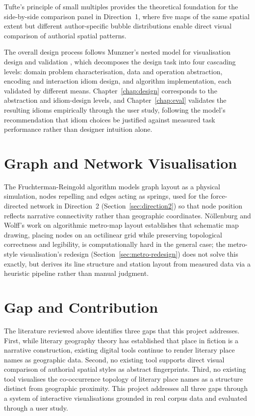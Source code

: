 \documentclass[logo,msc]{infthesis}
\begin{document}
Tufte's principle of small multiples \cite{tufte1983} provides the theoretical foundation for the side-by-side comparison panel in Direction~1, where five maps of the same spatial extent but different author-specific bubble distributions enable direct visual comparison of authorial spatial patterns.

The overall design process follows Munzner's nested model for visualisation design and validation \cite{munzner2014}, which decomposes the design task into four cascading levels: domain problem characterisation, data and operation abstraction, encoding and interaction idiom design, and algorithm implementation, each validated by different means. Chapter~\ref{chap:design} corresponds to the abstraction and idiom-design levels, and Chapter~\ref{chap:eval} validates the resulting idioms empirically through the user study, following the model's recommendation that idiom choices be justified against measured task performance rather than designer intuition alone.
 
\section{Graph and Network Visualisation}

The Fruchterman-Reingold algorithm \cite{fruchterman1991} models graph layout as a physical simulation, nodes repelling and edges acting as springs, used for the force-directed network in Direction~2 (Section~\ref{sec:direction2}) so that node position reflects narrative connectivity rather than geographic coordinates. N{\"o}llenburg and Wolff's work on algorithmic metro-map layout \cite{nollenburg2011} establishes that schematic map drawing, placing nodes on an octilinear grid while preserving topological correctness and legibility, is computationally hard in the general case; the metro-style visualisation's redesign (Section~\ref{sec:metro-redesign}) does not solve this exactly, but derives its line structure and station layout from measured data via a heuristic pipeline rather than manual judgment.
 
\section{Gap and Contribution}
 
The literature reviewed above identifies three gaps that this project addresses. First, while literary geography theory has established that place in fiction is a narrative construction, existing digital tools continue to render literary place names as geographic data. Second, no existing tool supports direct visual comparison of authorial spatial styles as abstract fingerprints. Third, no existing tool visualises the co-occurrence topology of literary place names as a structure distinct from geographic proximity. This project addresses all three gaps through a system of interactive visualisations grounded in real corpus data and evaluated through a user study.
 
\end{document}
